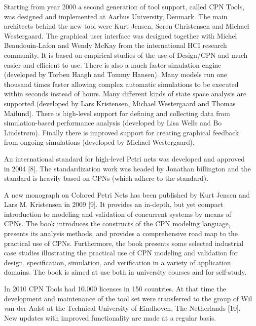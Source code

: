 Starting from year 2000 a second generation of tool support, called
CPN Tools, was designed and implemented at Aarhus University,
Denmark. The main architects behind the new tool were Kurt Jensen,
Søren Christensen and Michael Westergaard. The graphical user
interface was designed together with Michel Beaudouin-Lafon and Wendy
McKay from the international HCI research community. It is based on
empirical studies of the use of Design/CPN and much easier and
efficient to use. There is also a much faster simulation engine
(developed by Torben Haagh and Tommy Hansen). Many models run one
thousand times faster allowing complex automatic simulations to be
executed within seconds instead of hours. Many different kinds of
state space analysis are supported (developed by Lars Kristensen,
Michael Westergaard and Thomas Mailund). There is high-level support
for defining and collecting data from simulation-based performance
analysis (developed by Lisa Wells and Bo Lindstrøm). Finally there is
improved support for creating graphical feedback from ongoing
simulations (developed by Michael Westergaard).

An international standard for high-level Petri nets was developed and
approved in 2004 [8]. The standardization work was headed by Jonathan
billington and the standard is heavily based on CPNs (which adhere to
the standard).

A new monograph on Colored Petri Nets has been published by Kurt
Jensen and Lars M. Kristensen in 2009 [9]. It provides an in-depth,
but yet compact introduction to modeling and validation of concurrent
systems by means of CPNs. The book introduces the constructs of the
CPN modeling language, presents its analysis methods, and provides a
comprehensive road map to the practical use of CPNs. Furthermore, the
book presents some selected industrial case studies illustrating the
practical use of CPN modeling and validation for design,
specification, simulation, and verification in a variety of
application domains. The book is aimed at use both in university
courses and for self-study.

In 2010 CPN Tools had 10.000 licenses in 150 countries. At that time
the development and maintenance of the tool set were transferred to
the group of Wil van der Aalst at the Technical University of
Eindhoven, The Netherlands [10]. New updates with improved
functionality are made at a regular basis.
